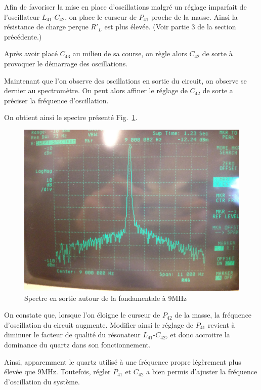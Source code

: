 \documentclass{article}
\begin{document}

Afin de favoriser la mise en place d'oscillations malgré un réglage imparfait de l'oscillateur $L_{41}$-$C_{42}$, on place le curseur de $P_{41}$ proche de la masse. Ainsi la résistance de charge perçue $R'_L$ est plus élevée. (Voir partie 3 de la section précédente.)

Après avoir placé $C_{43}$ au milieu de sa course, on règle alors $C_{42}$ de sorte à provoquer le démarrage des oscillations.



Maintenant que l'on observe des oscillations en sortie du circuit, on observe se dernier au spectromètre. On peut alors affiner le réglage de $C_{42}$ de sorte a préciser la fréquence d'oscillation.

On obtient ainsi le spectre présenté Fig.~\ref{fig:osc_quartz_spectre}.

\begin{figure}[h]
	\centering
	\includegraphics[width = 0.7\linewidth]{7_3_3_spectre9MHz.jpg}
	\caption{Spectre en sortie autour de la fondamentale à 9MHz}
	\label{fig:osc_quartz_spectre}
\end{figure}



On constate que, lorsque l'on éloigne le curseur de $P_{42}$ de la masse, la fréquence d'oscillation du circuit augmente. Modifier ainsi le réglage de $P_{41}$ revient à diminuer le facteur de qualité du résonateur $L_{41}$-$C_{42}$, et donc accroitre la dominance du quartz dans son fonctionnement. 

Ainsi, apparemment le quartz utilisé à une fréquence propre légèrement plus élevée que 9MHz. Toutefois, régler $P_{41}$ et $C_{42}$ a bien permis d'ajuster la fréquence d'oscillation du système.


\end{document}
